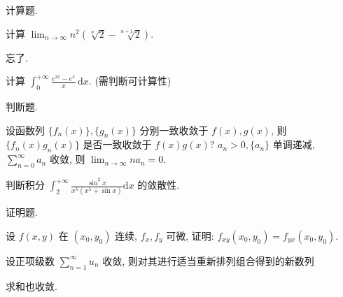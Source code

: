 \par{}
计算题.\par
计算 $\lim_{n\to \infty}n^2 (\sqrt[n]{2} -\sqrt[n + 1]{2}).$\par
忘了.\par
计算 $\int_0^{+\infty} \frac{e^{2x} - e^x}{x} \, \mathrm{d}x$. (需判断可计算性)\par
\par{}
判断题.\par
设函数列 $\{f_n(x)\}, \{g_n(x)\}$ 分别一致收敛于 $f(x), g(x)$, 则 $\{f_n(x)g_n(x)\}$ 是否一致收敛于 $f(x)g(x)$?
$a_n > 0, \{a_n\}$ 单调递减, $\sum_{n=0}^{\infty} a_n$ 收敛, 则 $\lim_{n \to \infty} na_n = 0$.\par
判断积分 $\int_{2}^{+\infty}\frac{\sin^2x}{x^\lambda(x^\lambda + \sin x)}\mathrm{d}x$ 的敛散性.\par
\par{}
证明题.\par
设 $f(x, y)$ 在 $(x_0, y_0)$ 连续, $f_x, f_y$ 可微, 证明: $f_{xy}(x_0, y_0) = f_{yx}(x_0, y_0)$.\par
\par{}
设正项级数 $\sum_{n=1}^{\infty} u_n$ 收敛, 则对其进行适当重新排列组合得到的新数列\par
\nopagebreak[4]
求和也收敛.\par
\par{}
